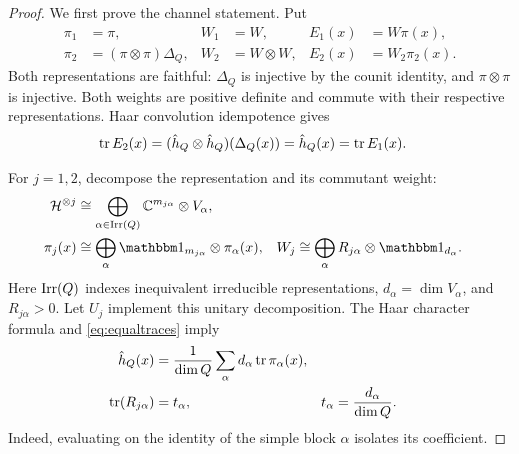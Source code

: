 \documentclass[aps,pra,reprint,nofootinbib,onecolumn]{revtex4-2}
\begin{document}
\begin{proof}
	We first prove the channel statement. Put
	\begin{align}
		\pi_1  & =\pi,
		       &
		W_1    & =W,
		       &
		E_1(x) & =W\pi(x),
		\\
		\pi_2  & =(\pi\otimes\pi)\Delta_Q,
		       &
		W_2    & =W\otimes W,
		       &
		E_2(x) & =W_2\pi_2(x).
	\end{align}
	Both representations are faithful: $\Delta_Q$ is injective by the
	counit identity, and $\pi\otimes\pi$ is injective.
	Both weights are positive definite and commute with their respective
	representations. Haar convolution idempotence gives
	\begin{align}
		\operatorname{tr} E_2(x)
		 & =(\hat h_Q\otimes\hat h_Q)(\Delta_Q(x))
		=\hat h_Q(x)=\operatorname{tr} E_1(x).
		\label{eq:equaltraces}
	\end{align}

	For $j=1,2$, decompose the representation and its commutant weight:
	\begin{align}
		\mc H^{\otimes j}
		         & \cong\bigoplus_{\alpha\in\Irr(Q)}
		\C^{m_{j\alpha}}\otimes V_\alpha,
		\\
		\pi_j(x) & \cong
		\bigoplus_\alpha\Id_{m_{j\alpha}}\otimes\pi_\alpha(x),
		         &
		W_j      & \cong
		\bigoplus_\alpha R_{j\alpha}\otimes\Id_{d_\alpha}.
		\label{eq:commutant}
	\end{align}
	Here $\operatorname{Irr}(Q)$ indexes inequivalent irreducible representations,
	$d_\alpha=\dim V_\alpha$, and $R_{j\alpha}>0$.
	Let $U_j$ implement this unitary decomposition.
	The Haar character formula and \cref{eq:equaltraces} imply
	\begin{align}
		\hat h_Q(x)
		                 & =\frac1{\dim Q}\sum_\alpha d_\alpha\operatorname{tr}\pi_\alpha(x),
		\\
		\operatorname{tr}(R_{j\alpha}) & =t_\alpha,
		                 &
		t_\alpha         & =\frac{d_\alpha}{\dim Q}.
		\label{eq:trweights}
	\end{align}
	Indeed, evaluating on the identity of the simple block $\alpha$
	isolates its coefficient.


\end{proof}
\end{document}
